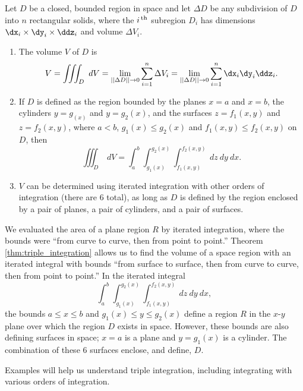 \noindent\hskip-100pt\begin{minipage}{\linewidth}
{Let $D$ be a closed, bounded region in space and let $\Delta D$ be any subdivision of $D$ into $n$ rectangular solids, where the  $i^\text{\,th}$ subregion $D_i$ has dimensions $\dx_i\times\dy_i\times\ddz_i$ and volume $\Delta V_i$.
\begin{enumerate}
	\item The volume $V$ of $D$ is
	$$V = \iiint_D\ dV = \lim_{||\Delta D||\to0} \sum_{i=1}^n \Delta V_i = \lim_{||\Delta D||\to0} \sum_{i=1}^n \dx_i\dy_i\ddz_i.$$
	
	\item		If $D$ is defined as the region bounded by the planes $x=a$ and $x=b$, the cylinders $y=g_(x)$ and $y=g_2(x)$, and the surfaces $z=f_1(x,y)$ and $z=f_2(x,y)$, where $a<b$, $g_1(x)\leq g_2(x)$ and $f_1(x,y)\leq f_2(x,y)$ on $D$, then
	$$\iiint_D \ dV = \int_a^b\int_{g_1(x)}^{g_2(x)}\int_{f_1(x,y)}^{f_2(x,y)} \ dz\ dy\ dx.$$
	
	\item		$V$ can be determined using iterated integration with other orders of integration (there are 6 total), as long as $D$ is defined by the region enclosed by a pair of planes, a pair of cylinders, and a pair of surfaces.
\end{enumerate}
}
\end{minipage}
\restoreboxwidth

We evaluated the area of a plane region $R$ by iterated integration, where the bounds were ``from curve to curve, then from point to point.'' Theorem \ref{thm:triple_integration} allows us to find the volume of a space region with an iterated integral with bounds ``from surface to surface, then from curve to curve, then from point to point.'' In the iterated integral 
$$\int_a^b\int_{g_1(x)}^{g_2(x)}\int_{f_1(x,y)}^{f_2(x,y)} \ dz\ dy\ dx,$$
the bounds $a\leq x\leq b$ and $g_1(x)\leq y\leq g_2(x)$ define a region $R$ in the $x$-$y$ plane over which the region $D$ exists in space. However, these bounds are also defining surfaces in space; $x=a$ is a plane and $y=g_1(x)$ is a cylinder. The combination of these 6 surfaces enclose, and define, $D$.

Examples will help us understand triple integration, including integrating with various orders of integration.\\

